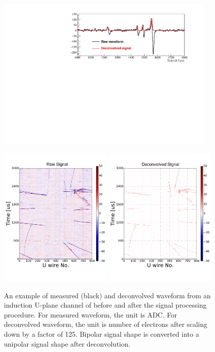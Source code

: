 \begin{figure}[!h!tbp]
\centering
\includegraphics[width=0.95\textwidth]{graphics/sample_5141_23865.pdf}
\caption[Measured and deconvolved waveform from an induction U-plane channel of ]{An example of measured (black) and deconvolved waveform from an induction U-plane channel of 
before and after the signal processing procedure. For measured waveform, the unit is ADC. For deconvolved
waveform, the unit is number of electrons after scaling down by a factor of 125.
Bipolar signal shape is converted into a unipolar signal shape after \twod deconvolution.}
\label{pDUNE_sp_wf}
\includegraphics[width=0.49\textwidth]{graphics/protodune_raw_u.pdf}
\includegraphics[width=0.49\textwidth]{graphics/protodune_decon_u.pdf}

\end{figure}
